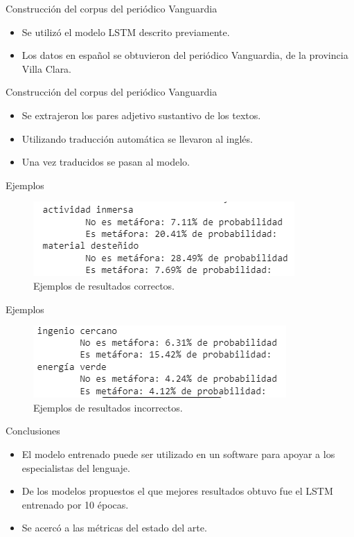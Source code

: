 \documentclass[12pt]{beamer}
\begin{document}
\begin{frame}{Construcción del corpus del periódico Vanguardia}
\begin{itemize}
\item Se utilizó el modelo LSTM descrito previamente.
\item Los datos en español se obtuvieron del periódico Vanguardia, de la provincia Villa Clara.
\end{itemize}
\end{frame}
\begin{frame}{Construcción del corpus del periódico Vanguardia}
\begin{itemize}
\item Se extrajeron los pares adjetivo sustantivo de los textos.
\item Utilizando traducción automática se llevaron al inglés.
\item Una vez traducidos se pasan al modelo. 
\end{itemize}
\end{frame}
\begin{frame}{Ejemplos}
\begin{figure}[htb]\label{Fig:good}
\includegraphics[scale= 1.0]{Graphics/good_example.png}
\caption{Ejemplos de resultados correctos.}
\end{figure}
\end{frame}
\begin{frame}{Ejemplos}
\begin{figure}[htb]\label{Fig:good}
\includegraphics[scale= 1.0]{Graphics/bad_example.png}
\caption{Ejemplos de resultados incorrectos.}
\end{figure}
\end{frame}
\begin{frame}{Conclusiones}
\begin{itemize}
\item El modelo entrenado puede ser utilizado en un software para apoyar a los especialistas del lenguaje.
\item De los modelos propuestos el que mejores resultados obtuvo fue
el LSTM entrenado por 10 épocas.
\item Se acercó a las métricas del estado del arte.
\end{itemize}
\end{frame}
\end{document}
